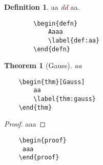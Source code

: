 \documentclass[a4paper,10pt,landscape]{article}
\newtheorem{thm}{Theorem}[section]
\theoremstyle{definition}
\newtheorem{defn}{Definition}[section]
\theoremstyle{remark}
\newcommand{\hDef}[1]{\textcolor{darkred}{\textit{#1}}} %
\newcommand{\refthm}[1]{Theorem~\ref{#1}}
\begin{document}
\begin{multicols}{3}
\begin{multicols}{2}
	\begin{defn}
		aa \hDef{dd} aa.
		\label{def:aa}
	\end{defn}
\columnbreak
	\begin{verbatim}
		\begin{defn}
			Aaaa
			\label{def:aa}
		\end{defn}
	\end{verbatim}
\end{multicols}

\begin{multicols}{2}
	\begin{thm}[Gauss]
		aa	
		\label{thm:gauss}
	\end{thm}
\columnbreak
	\begin{verbatim}
	\begin{thm}[Gauss]
		aa	
		\label{thm:gauss}
	\end{thm}
	\end{verbatim}
\end{multicols}
\begin{multicols}{2}
	\begin{proof}
		aaa
	\end{proof}
\columnbreak
	\begin{verbatim}
	\begin{proof}
	 aaa
	\end{proof}
	\end{verbatim}
\end{multicols}


\end{multicols}
\end{document}
